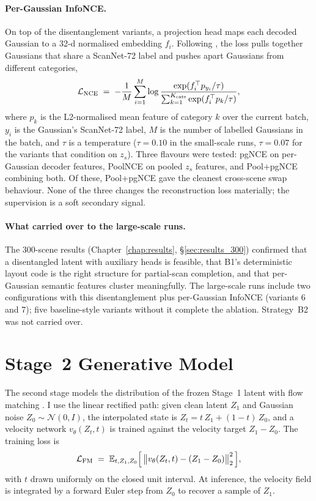 \paragraph{Per-Gaussian InfoNCE.} On top of the disentanglement variants, a projection head maps each decoded Gaussian to a 32-d normalised embedding $f_i$. Following \citet{oord2018cpc}, the loss pulls together Gaussians that share a ScanNet-72 label and pushes apart Gaussians from different categories,
\begin{equation}
\mathcal{L}_{\text{NCE}} \;=\; -\frac{1}{M}\sum_{i=1}^{M}\log \frac{\exp(f_i^\top p_{y_i}/\tau)}{\sum_{k=1}^{K_{\text{cats}}} \exp(f_i^\top p_k/\tau)},
\label{eq:infonce}
\end{equation}
where $p_k$ is the L2-normalised mean feature of category $k$ over the current batch, $y_i$ is the Gaussian's ScanNet-72 label, $M$ is the number of labelled Gaussians in the batch, and $\tau$ is a temperature ($\tau = 0.10$ in the small-scale runs, $\tau = 0.07$ for the variants that condition on $z_s$). Three flavours were tested: pgNCE on per-Gaussian decoder features, PoolNCE on pooled $z_s$ features, and Pool+pgNCE combining both. Of these, Pool+pgNCE gave the cleanest cross-scene swap behaviour. None of the three changes the reconstruction loss materially; the supervision is a soft secondary signal.

\paragraph{What carried over to the large-scale runs.} The 300-scene results (Chapter~\ref{chap:results}, \S\ref{sec:results_300}) confirmed that a disentangled latent with auxiliary heads is feasible, that B1's deterministic layout code is the right structure for partial-scan completion, and that per-Gaussian semantic features cluster meaningfully. The large-scale runs include two configurations with this disentanglement plus per-Gaussian InfoNCE (variants 6 and 7); five baseline-style variants without it complete the ablation. Strategy~B2 was not carried over.

\section{Stage~2 Generative Model}
\label{sec:method_stage2}

The second stage models the distribution of the frozen Stage~1 latent with flow matching \citep{lipman2023flowmatching, liu2023rectified}. I use the linear rectified path: given clean latent $Z_1$ and Gaussian noise $Z_0 \sim \mathcal{N}(0, I)$, the interpolated state is $Z_t = t\,Z_1 + (1-t)\,Z_0$, and a velocity network $v_\theta(Z_t, t)$ is trained against the velocity target $Z_1 - Z_0$. The training loss is
\begin{equation}
\mathcal{L}_{\text{FM}} \;=\; \mathbb{E}_{t, Z_1, Z_0}\Bigl[\, \bigl\lVert v_\theta(Z_t, t) - (Z_1 - Z_0)\bigr\rVert_2^2 \,\Bigr],
\label{eq:flow_matching}
\end{equation}
with $t$ drawn uniformly on the closed unit interval. At inference, the velocity field is integrated by a forward Euler step from $Z_0$ to recover a sample of $Z_1$.

